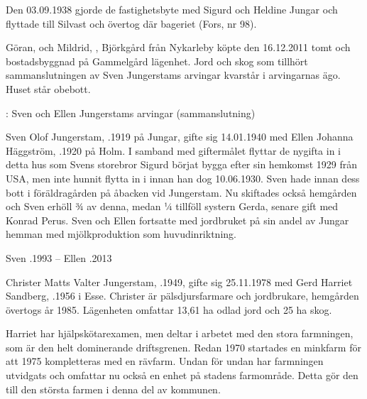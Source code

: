 Den 03.09.1938 gjorde de fastighetsbyte med Sigurd och Heldine Jungar och flyttade till Silvast och övertog där bageriet (Fors, nr 98).




Göran,  och Mildrid, , Björkgård från Nykarleby köpte den 16.12.2011 tomt och bostadsbyggnad på Gammelgård lägenhet. Jord och skog som tillhört sammanslutningen av Sven Jungerstams arvingar kvarstår i arvingarnas ägo. Huset står obebott.


: Sven och Ellen Jungerstams arvingar (sammanslutning)


Sven Olof Jungerstam, .1919 på Jungar, gifte sig 14.01.1940 med Ellen Johanna Häggström, .1920 på Holm. I samband med giftermålet flyttar de nygifta in i detta hus som Svens storebror Sigurd börjat bygga efter sin hemkomst 1929 från USA, men inte hunnit flytta in i innan han dog 10.06.1930. Sven hade innan dess bott i föräldragården på åbacken vid Jungerstam. Nu skiftades också hemgården och Sven erhöll ¾ av denna, medan ¼ tillföll systern Gerda, senare gift med Konrad Perus.
Sven och Ellen fortsatte med jordbruket på sin andel av Jungar hemman med mjölkproduktion som huvudinriktning.
\begin{jhchildren}
  \item {}
  \item {}
  \item {}
\end{jhchildren}
Sven .1993  --  Ellen .2013




Christer Matts Valter Jungerstam, .1949, gifte sig 25.11.1978 med Gerd Harriet Sandberg, .1956 i Esse. Christer är pälsdjursfarmare och jordbrukare, hemgården övertogs år 1985. Lägenheten omfattar 13,61 ha odlad jord och 25 ha skog.

Harriet har hjälpskötarexamen, men deltar i arbetet med den stora farmningen, som är den helt dominerande driftsgrenen. Redan 1970 startades en minkfarm för att 1975 kompletteras med en rävfarm. Undan för undan har farmningen utvidgats och omfattar nu också en enhet på stadens farmområde. Detta gör den till den största farmen i denna del av kommunen.

